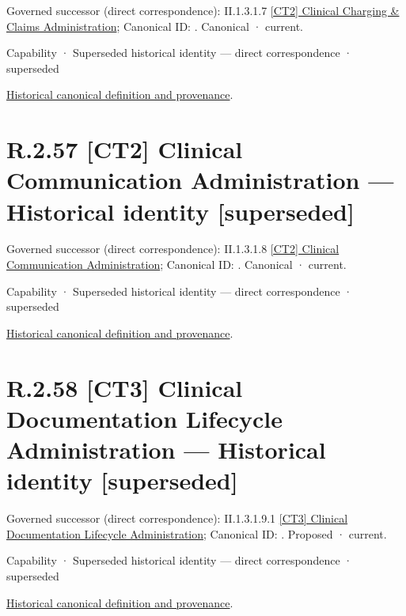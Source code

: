 {\small Governed successor (direct correspondence): II.1.3.1.7 \hyperref[element:af78ab7c89454a608cd4d34ec7703331]{[CT2] Clinical Charging \& Claims Administration}; Canonical ID: \texttt{}. Canonical · current.}\par
\label{element:44433108cc8f4f5f9d7581f9e5b29eb5}
{\small Capability · Superseded historical identity — direct correspondence · superseded}\par
\href{../../../../continuum/strategy/capability/44433108cc8f4f5f9d7581f9e5b29eb5.md}{Historical canonical definition and provenance}.\par
\section*{R.2.57 [CT2] Clinical Communication Administration — Historical identity [superseded]}
\label{navigation:R.2.57}

{\small Governed successor (direct correspondence): II.1.3.1.8 \hyperref[element:b38f2c2811724734b5887b6dbaaabbfc]{[CT2] Clinical Communication Administration}; Canonical ID: \texttt{}. Canonical · current.}\par
\label{element:bd4d6f4a7f03402ba7857383c7be7a4c}
{\small Capability · Superseded historical identity — direct correspondence · superseded}\par
\href{../../../../continuum/strategy/capability/bd4d6f4a7f03402ba7857383c7be7a4c.md}{Historical canonical definition and provenance}.\par
\section*{R.2.58 [CT3] Clinical Documentation Lifecycle Administration — Historical identity [superseded]}
\label{navigation:R.2.58}

{\small Governed successor (direct correspondence): II.1.3.1.9.1 \hyperref[element:df683100067b47e785037c27cfd17a3c]{[CT3] Clinical Documentation Lifecycle Administration}; Canonical ID: \texttt{}. Proposed · current.}\par
\label{element:5b1636373a8d4e788b3ddbc1659a47ef}
{\small Capability · Superseded historical identity — direct correspondence · superseded}\par
\href{../../../../continuum/strategy/capability/5b1636373a8d4e788b3ddbc1659a47ef.md}{Historical canonical definition and provenance}.\par
